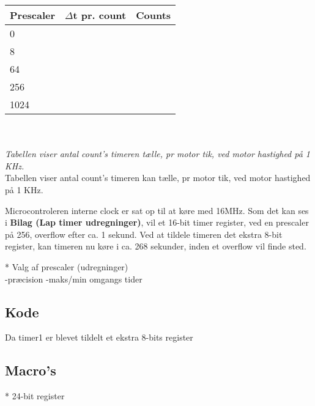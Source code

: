 \begin{tabular}{ | l | c | r | }
	\hline
	Prescaler 	& $\Delta$t pr. count 	& Counts	\\
	\hline
	0 			& 	 			&  			\\
	\hline	
	8 			& 	 			&  			\\
	\hline
	64 			& 	 			&  			\\
	\hline
	256 		& 	 			&  			\\
	\hline
	1024 		& 	 			&  			\\
	\hline
\end{tabular}\\\\
\textsl{\footnotesize *Tabellen viser antal count's timeren tælle, pr motor tik, ved motor hastighed på 1 KHz.}\\


Tabellen viser antal count's timeren kan tælle, pr motor tik, ved motor hastighed på 1 KHz. 

Microcontroleren interne clock er sat op til at køre med 16MHz. Som det kan ses i \textbf{Bilag (Lap timer udregninger)}, vil et 16-bit timer register, ved en prescaler på 256, overflow efter ca. 1 sekund. Ved at tildele timeren det ekstra 8-bit register, kan timeren nu køre i ca. 268 sekunder, inden et overflow vil finde sted. 


* Valg af prescaler (udregninger)\\
	-præcision
	-maks/min omgangs tider 


\subsection{Kode}
Da timer1 er blevet tildelt et ekstra 8-bits register
\subsection{Macro's}


	
* 24-bit register\\
